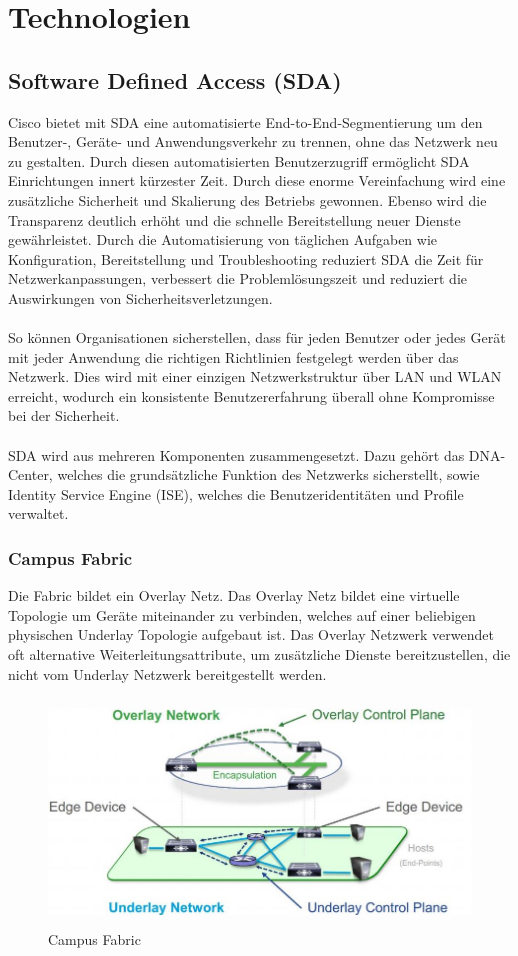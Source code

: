 \section{Technologien}

\subsection{Software Defined Access (SDA)}
Cisco bietet mit SDA eine automatisierte End-to-End-Segmentierung um den Benutzer-, Geräte- und Anwendungsverkehr zu trennen, ohne das Netzwerk neu zu gestalten. Durch diesen automatisierten Benutzerzugriff ermöglicht SDA Einrichtungen innert kürzester Zeit. Durch diese enorme Vereinfachung wird eine zusätzliche Sicherheit und Skalierung des Betriebs gewonnen. Ebenso wird die Transparenz deutlich erhöht und die schnelle Bereitstellung neuer Dienste gewährleistet. Durch die Automatisierung von täglichen Aufgaben wie Konfiguration, Bereitstellung und Troubleshooting reduziert SDA die Zeit für Netzwerkanpassungen, verbessert die Problemlösungszeit und reduziert die Auswirkungen von Sicherheitsverletzungen.\\
\\
So können Organisationen sicherstellen, dass für jeden Benutzer oder jedes Gerät mit jeder Anwendung die richtigen Richtlinien festgelegt werden über das Netzwerk. Dies wird mit einer einzigen Netzwerkstruktur über LAN und WLAN erreicht, wodurch ein konsistente Benutzererfahrung überall ohne Kompromisse bei der Sicherheit. \\
\\
SDA wird aus mehreren Komponenten zusammengesetzt. Dazu gehört das DNA-Center, welches die grundsätzliche Funktion des Netzwerks sicherstellt, sowie Identity Service Engine (ISE), welches die Benutzeridentitäten und Profile verwaltet.

\subsubsection{Campus Fabric}
Die Fabric bildet ein Overlay Netz. Das Overlay Netz bildet eine virtuelle Topologie um Geräte miteinander zu verbinden, welches auf einer beliebigen physischen Underlay Topologie aufgebaut ist. Das Overlay Netzwerk verwendet oft alternative Weiterleitungsattribute, um zusätzliche Dienste bereitzustellen, die nicht vom Underlay Netzwerk bereitgestellt werden.
\begin{figure}[H]
	\centering
	\includegraphics[height=6cm]{img/campusfabric.jpg}
	\caption{Campus Fabric}
	\label{fig:Campus Fabric}
\end{figure}

